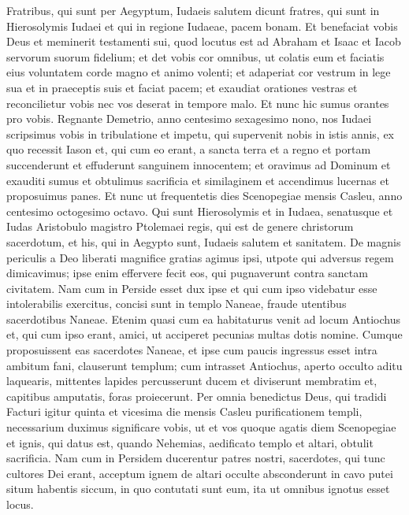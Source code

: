 \begin{biblechapter}
 \verse Fratribus, qui sunt per Aegyptum, Iudaeis salutem dicunt fratres, qui sunt in Hierosolymis Iudaei et qui in regione Iudaeae, pacem bonam. 
 \verse Et benefaciat vobis Deus et meminerit testamenti sui, quod locutus est ad Abraham et Isaac et Iacob servorum suorum fidelium; 
\verse et det vobis cor omnibus, ut colatis eum et faciatis eius voluntatem corde magno et animo volenti; 
\verse et adaperiat cor vestrum in lege sua et in praeceptis suis et faciat pacem; 
\verse et exaudiat orationes vestras et reconcilietur vobis nec vos deserat in tempore malo. 
\verse Et nunc hic sumus orantes pro vobis. 
\verse Regnante Demetrio, anno centesimo sexagesimo nono, nos Iudaei scripsimus vobis in tribulatione et impetu, qui supervenit nobis in istis annis, ex quo recessit Iason et, qui cum eo erant, a sancta terra et a regno 
\verse et portam succenderunt et effuderunt sanguinem innocentem; et oravimus ad Dominum et exauditi sumus et obtulimus sacrificia et similaginem et accendimus lucernas et proposuimus panes. 
\verse Et nunc ut frequentetis dies Scenopegiae mensis Casleu, 
 \verse anno centesimo octogesimo octavo.
 Qui sunt Hierosolymis et in Iudaea, senatusque et Iudas Aristobulo magistro Ptolemaei regis, qui est de genere christorum sacerdotum, et his, qui in Aegypto sunt, Iudaeis salutem et sanitatem. 
\verse De magnis periculis a Deo liberati magnifice gratias agimus ipsi, utpote qui adversus regem dimicavimus; 
\verse ipse enim effervere fecit eos, qui pugnaverunt contra sanctam civitatem. 
\verse Nam cum in Perside esset dux ipse et qui cum ipso videbatur esse intolerabilis exercitus, concisi sunt in templo Naneae, fraude utentibus sacerdotibus Naneae. 
\verse Etenim quasi cum ea habitaturus venit ad locum Antiochus et, qui cum ipso erant, amici, ut acciperet pecunias multas dotis nomine. 
\verse Cumque proposuissent eas sacerdotes Naneae, et ipse cum paucis ingressus esset intra ambitum fani, clauserunt templum; cum intrasset Antiochus, 
\verse aperto occulto aditu laquearis, mittentes lapides percusserunt ducem et diviserunt membratim et, capitibus amputatis, foras proiecerunt. 
\verse Per omnia benedictus Deus, qui tradidi 
\verse Facturi igitur quinta et vicesima die mensis Casleu purificationem templi, necessarium duximus significare vobis, ut et vos quoque agatis diem Scenopegiae et ignis, qui datus est, quando Nehemias, aedificato templo et altari, obtulit sacrificia. 
\verse Nam cum in Persidem ducerentur patres nostri, sacerdotes, qui tunc cultores Dei erant, acceptum ignem de altari occulte absconderunt in cavo putei situm habentis siccum, in quo contutati sunt eum, ita ut omnibus ignotus esset locus. 

\end{biblechapter}

